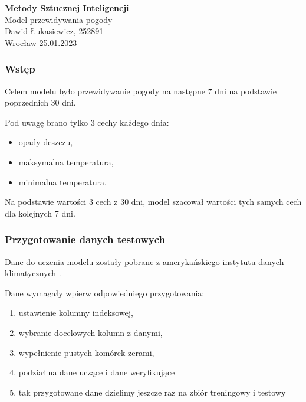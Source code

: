 \documentclass[usepdftitle=false,24pt]{beamer}
\date{}
\def\mytitle{Metody Sztucznej Inteligencji}
\def\myauthor{Dawid Łukasiewicz, 252891}
\def\addinfo{Model przewidywania pogody}
\def\mydate{25.01.2023}
\begin{document}
\begin{frame}
    \begin{titlepage}
        \centering
        {\huge\bfseries \mytitle\\}
        \vspace{2cm}
        {\Large \addinfo\\}
        \vspace{.4cm}
        {\Large \myauthor\\}
        \vspace{1cm}
        {\large Wrocław \mydate }
        \vfill

    \end{titlepage}
\end{frame}

\begin{frame}
    \frametitle{Wstęp}

    Celem modelu było przewidywanie pogody na następne 7 dni na podstawie poprzednich 30 dni.

    \vspace*{1cm}

    Pod uwagę brano tylko 3 cechy każdego dnia:
    \begin{itemize}
            \item opady deszczu,
            \item maksymalna temperatura,
            \item minimalna temperatura.
        \end{itemize}

    \vspace*{1cm}

    Na podstawie wartości 3 cech z 30 dni, model szacował wartości tych  samych cech dla kolejnych 7 dni.

\end{frame}

\begin{frame}
    \frametitle{Przygotowanie danych testowych}

    Dane do uczenia modelu zostały pobrane z amerykańskiego instytutu danych klimatycznych \cite{NCEI-Data}.

    \vspace*{1cm}

    Dane wymagały wpierw odpowiedniego przygotowania:
    \begin{enumerate}
        \item ustawienie kolumny indeksowej,
        \item wybranie docelowych kolumn z danymi,
        \item wypełnienie pustych komórek zerami,
        \item podział na dane uczące i dane weryfikujące
        \item tak przygotowane dane dzielimy jeszcze raz na zbiór treningowy i testowy
    \end{enumerate}

\end{frame}
\end{document}
